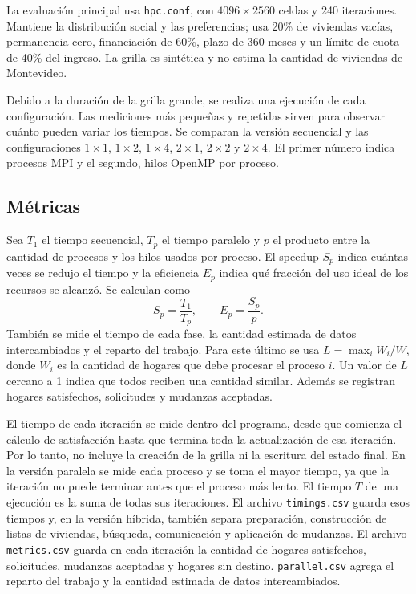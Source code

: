 La evaluación principal usa \texttt{hpc.conf}, con $4096\times2560$ celdas y 240 iteraciones. Mantiene la distribución social y las preferencias; usa 20\% de viviendas vacías, permanencia cero, financiación de 60\%, plazo de 360 meses y un límite de cuota de 40\% del ingreso. La grilla es sintética y no estima la cantidad de viviendas de Montevideo.

Debido a la duración de la grilla grande, se realiza una ejecución de cada configuración. Las mediciones más pequeñas y repetidas sirven para observar cuánto pueden variar los tiempos. Se comparan la versión secuencial y las configuraciones $1\times1$, $1\times2$, $1\times4$, $2\times1$, $2\times2$ y $2\times4$. El primer número indica procesos MPI y el segundo, hilos OpenMP por proceso.

\subsection{Métricas}

Sea $T_1$ el tiempo secuencial, $T_p$ el tiempo paralelo y $p$ el producto entre la cantidad de procesos y los hilos usados por proceso. El speedup $S_p$ indica cuántas veces se redujo el tiempo y la eficiencia $E_p$ indica qué fracción del uso ideal de los recursos se alcanzó. Se calculan como
\begin{equation}
S_p=\frac{T_1}{T_p}, \qquad E_p=\frac{S_p}{p}.
\end{equation}
También se mide el tiempo de cada fase, la cantidad estimada de datos intercambiados y el reparto del trabajo. Para este último se usa $L=\max_i W_i/\overline{W}$, donde $W_i$ es la cantidad de hogares que debe procesar el proceso $i$. Un valor de $L$ cercano a 1 indica que todos reciben una cantidad similar. Además se registran hogares satisfechos, solicitudes y mudanzas aceptadas.

El tiempo de cada iteración se mide dentro del programa, desde que comienza el cálculo de satisfacción hasta que termina toda la actualización de esa iteración. Por lo tanto, no incluye la creación de la grilla ni la escritura del estado final. En la versión paralela se mide cada proceso y se toma el mayor tiempo, ya que la iteración no puede terminar antes que el proceso más lento. El tiempo $T$ de una ejecución es la suma de todas sus iteraciones. El archivo \texttt{timings.csv} guarda esos tiempos y, en la versión híbrida, también separa preparación, construcción de listas de viviendas, búsqueda, comunicación y aplicación de mudanzas. El archivo \texttt{metrics.csv} guarda en cada iteración la cantidad de hogares satisfechos, solicitudes, mudanzas aceptadas y hogares sin destino. \texttt{parallel.csv} agrega el reparto del trabajo y la cantidad estimada de datos intercambiados.

